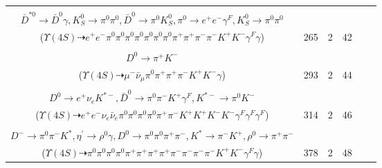 \documentclass[landscape]{article}
\newcounter{rownumbers}
\newcommand\rn{\stepcounter{rownumbers}\arabic{rownumbers}}
\newcommand{\EOLP}{\\ \hline} %
\newcommand{\topoTags}[1]{#1} %
\begin{document}
\begin{longtable}{clcccc}
\rn & \makecell[l]{ $ 
\Upsilon(4S) \rightarrow B^{0} \bar{B}^{0} ,
B^{0} \rightarrow \rho^{-} K_{0}^{*+} ,
\bar{B}^{0} \rightarrow \pi^{+} \pi^{-} K^{-} D^{+} \bar{D}^{*0} ,
\rho^{-} \rightarrow \pi^{0} \pi^{-} ,
K_{0}^{*+} \rightarrow \pi^{0} K^{+} ,
D^{+} \rightarrow \pi^{0} \pi^{+} K_{S}^{0} ,
$ \\ $
\bar{D}^{*0} \rightarrow \bar{D}^{0} \gamma ,
K_{S}^{0} \rightarrow \pi^{0} \pi^{0} ,
\bar{D}^{0} \rightarrow \pi^{0} K_{S}^{0} ,
\pi^{0} \rightarrow e^{+} e^{-} \gamma^{F} ,
K_{S}^{0} \rightarrow \pi^{0} \pi^{0} 
$ \\ ($
\Upsilon(4S) \dashrightarrow e^{+} e^{-} \pi^{0} \pi^{0} \pi^{0} \pi^{0} \pi^{0} \pi^{0} \pi^{0} \pi^{+} \pi^{+} \pi^{-} \pi^{-} K^{+} K^{-} \gamma^{F} \gamma 
$) } & \topoTags{265 & }2 & 42 \EOLP

\rn & \makecell[l]{ $ 
\Upsilon(4S) \rightarrow B^{0} \bar{B}^{0} ,
B^{0} \rightarrow \pi^{0} \bar{D}^{*0} ,
\bar{B}^{0} \rightarrow \mu^{-} \bar{\nu}_{\mu} D^{*+} ,
\bar{D}^{*0} \rightarrow \bar{D}^{0} \gamma ,
D^{*+} \rightarrow \pi^{+} D^{0} ,
\bar{D}^{0} \rightarrow \pi^{-} K^{+} ,
$ \\ $
D^{0} \rightarrow \pi^{+} K^{-} 
$ \\ ($
\Upsilon(4S) \dashrightarrow \mu^{-} \bar{\nu}_{\mu} \pi^{0} \pi^{+} \pi^{+} \pi^{-} K^{+} K^{-} \gamma 
$) } & \topoTags{293 & }2 & 44 \EOLP

\rn & \makecell[l]{ $ 
\Upsilon(4S) \rightarrow B^{0} \bar{B}^{0} ,
B^{0} \rightarrow \pi^{0} \bar{D}^{0} ,
\bar{B}^{0} \rightarrow K^{-} D^{*+} \bar{D}^{*0} ,
\bar{D}^{0} \rightarrow e^{-} \bar{\nu}_{e} K^{+} \gamma^{F} \gamma^{F} ,
D^{*+} \rightarrow \pi^{+} D^{0} ,
\bar{D}^{*0} \rightarrow \pi^{0} \bar{D}^{0} ,
$ \\ $
D^{0} \rightarrow e^{+} \nu_{e} K^{*-} ,
\bar{D}^{0} \rightarrow \pi^{0} \pi^{-} K^{+} \gamma^{F} ,
K^{*-} \rightarrow \pi^{0} K^{-} 
$ \\ ($
\Upsilon(4S) \dashrightarrow e^{+} e^{-} \nu_{e} \bar{\nu}_{e} \pi^{0} \pi^{0} \pi^{0} \pi^{0} \pi^{+} \pi^{-} K^{+} K^{+} K^{-} K^{-} \gamma^{F} \gamma^{F} \gamma^{F} 
$) } & \topoTags{314 & }2 & 46 \EOLP

\rn & \makecell[l]{ $ 
\Upsilon(4S) \rightarrow B^{0} \bar{B}^{0} ,
B^{0} \rightarrow D^{*-} D_{s}^{+} ,
\bar{B}^{0} \rightarrow K^{-} D^{*+} \gamma^{F} ,
D^{*-} \rightarrow \pi^{0} D^{-} ,
D_{s}^{+} \rightarrow \pi^{+} \eta^{\prime} ,
D^{*+} \rightarrow \pi^{+} D^{0} ,
$ \\ $
D^{-} \rightarrow \pi^{0} \pi^{-} K^{*} ,
\eta^{\prime} \rightarrow \rho^{0} \gamma ,
D^{0} \rightarrow \pi^{0} \pi^{0} \pi^{+} \pi^{-} ,
K^{*} \rightarrow \pi^{-} K^{+} ,
\rho^{0} \rightarrow \pi^{+} \pi^{-} 
$ \\ ($
\Upsilon(4S) \dashrightarrow \pi^{0} \pi^{0} \pi^{0} \pi^{0} \pi^{+} \pi^{+} \pi^{+} \pi^{+} \pi^{-} \pi^{-} \pi^{-} \pi^{-} K^{+} K^{-} \gamma^{F} \gamma 
$) } & \topoTags{378 & }2 & 48 \EOLP


\end{longtable}
\end{document}
